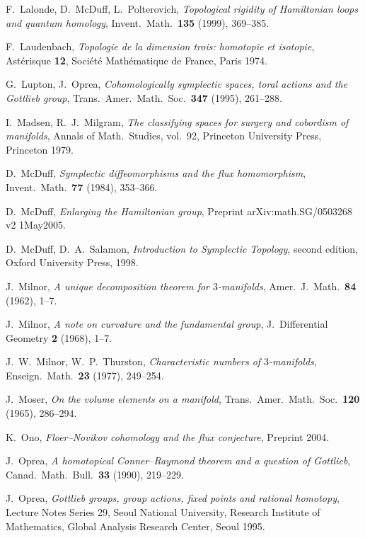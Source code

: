 \documentclass[12pt]{amsart}
\theoremstyle{definition}
\theoremstyle{remark}
\begin{document}
\begin{thebibliography}{999}
F.~Lalonde, D.~McDuff, L.~Polterovich,
{\it Topological rigidity of Hamiltonian loops and quantum homology},
Invent.~Math.~{\bf 135}
(1999), 369--385.

F.~Laudenbach, {\sl Topologie de la dimension trois: homotopie et isotopie},
Ast\'erisque {\bf 12}, Soci\'et\'e Math\'ematique de France, Paris 1974.

G.~Lupton, J.~Oprea,
{\it Cohomologically symplectic spaces, toral actions and the Gottlieb group},
Trans.~Amer.~Math.~Soc.~{\bf 347} (1995), 261--288.

I.~Madsen, R.~J.~Milgram,
{\sl The classifying spaces for surgery and cobordism of manifolds},
Annals of Math.~Studies, vol.~92, Princeton University Press, Princeton 1979.

D.~McDuff,
{\it Symplectic diffeomorphisms and the flux homomorphism},
Invent.~Math.~{\bf 77}
(1984), 353--366.

D.~McDuff,
{\it Enlarging the Hamiltonian group},
Preprint arXiv:math.SG/0503268 v2 1May2005.

D.~McDuff, D.~A.~Salamon,
{\sl Introduction to Symplectic Topology},
second edition, Oxford University Press,
1998.

J.~Milnor, {\it A unique decomposition theorem for $3$-manifolds}, 
Amer.~J.~Math.~{\bf 84} (1962), 1--7.

J.~Milnor, {\it A note on curvature and the fundamental group}, 
J.~Differential Geometry {\bf 2} (1968), 1--7.

J.~W.~Milnor, W.~P.~Thurston,
{\it Characteristic numbers of $3$-manifolds},
Enseign.~Math.~{\bf 23} (1977), 249--254. 

J.~Moser,
{\it On the volume elements on a manifold},
Trans.~Amer.~Math.~Soc.~{\bf 120}
(1965), 286--294.

K.~Ono,
{\it Floer--Novikov cohomology and the flux conjecture}, Preprint 2004.

J.~Oprea,
{\it A homotopical Conner--Raymond theorem and a question of 
Gottlieb},
Canad.~Math.~Bull.~{\bf 33} (1990), 219--229.

J.~Oprea,
{\sl Gottlieb groups, group actions, fixed points and rational homotopy},
Lecture Notes Series 29, Seoul National University, Research Institute of 
Mathematics, Global Analysis Research Center, Seoul 1995.


\end{thebibliography}
\end{document}
